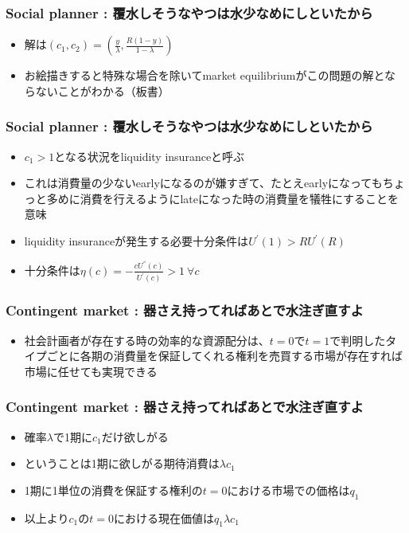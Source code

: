 \documentclass[dvipdfmx, 12pt]{beamer}
\begin{document}
\begin{frame}\frametitle{Social planner : \small 覆水しそうなやつは水少なめにしといたから}
	\begin{itemize}
		\item 解は$(c_1, c_2) = (\frac{y}{\lambda}, \frac{R(1 - y)}{1 - \lambda})$
		\item お絵描きすると特殊な場合を除いてmarket equilibriumがこの問題の解とならないことがわかる（板書）
	\end{itemize}
\end{frame}
\begin{frame}\frametitle{Social planner : \small 覆水しそうなやつは水少なめにしといたから}
	\begin{itemize}
		\item $c_1 > 1$となる状況をliquidity insuranceと呼ぶ
		\item これは消費量の少ないearlyになるのが嫌すぎて、たとえearlyになってもちょっと多めに消費を行えるようにlateになった時の消費量を犠牲にすることを意味
		\item liquidity insuranceが発生する必要十分条件は$U^{'}(1) > R U^{'}(R)$
		\item 十分条件は$\eta(c) = -\frac{cU^{''}(c)}{U^{'}(c)} > 1\ \forall c$
	\end{itemize}
\end{frame}
\begin{frame}\frametitle{Contingent market : \small 器さえ持ってればあとで水注ぎ直すよ}
	\begin{itemize}
		\item 社会計画者が存在する時の効率的な資源配分は、$t = 0$で$t = 1$で判明したタイプごとに各期の消費量を保証してくれる権利を売買する市場が存在すれば市場に任せても実現できる
	\end{itemize}
\end{frame}
\begin{frame}\frametitle{Contingent market : \small 器さえ持ってればあとで水注ぎ直すよ}
	\begin{itemize}
		\item 確率$\lambda$で1期に$c_1$だけ欲しがる
		\item ということは1期に欲しがる期待消費は$\lambda c_1$
		\item 1期に1単位の消費を保証する権利の$t = 0$における市場での価格は$q_1$
		\item 以上より$c_1$の$t = 0$における現在価値は$q_1 \lambda c_1$
	\end{itemize}
\end{frame}
\end{document}

